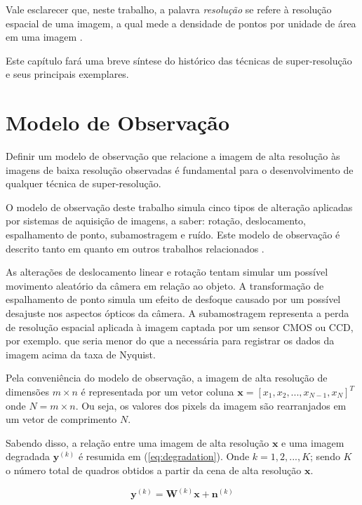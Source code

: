 \documentclass[12pt,openright,oneside,a4paper,english,brazil]{abntex2}
\begin{document}
Vale esclarecer que, neste trabalho, a palavra \textit{resolução} se refere à resolução espacial de uma imagem, a qual mede a densidade de pontos por unidade de área em uma imagem \cite{zibetti2007super}.

Este capítulo fará uma breve síntese do histórico das técnicas de super-resolução e seus principais exemplares.

\section{Modelo de Observação}
\label{sec:obsmodel}

Definir um modelo de observação que relacione a imagem de alta resolução às imagens de baixa resolução observadas é fundamental para o desenvolvimento de qualquer técnica de super-resolução.

O modelo de observação deste trabalho simula cinco tipos de alteração aplicadas por sistemas de aquisição de imagens, a saber: rotação, deslocamento, espalhamento de ponto, subamostragem e ruído.
Este modelo de observação é descrito tanto em \cite{tipping2003bayesian} quanto em outros trabalhos relacionados \cite{pickup2007bayesian, Capel01a}.

As alterações de deslocamento linear e rotação tentam simular um possível movimento aleatório da câmera em relação ao objeto.
A transformação de espalhamento de ponto simula um efeito de desfoque causado por um possível desajuste nos aspectos ópticos da câmera.
A subamostragem representa a perda de resolução espacial aplicada à imagem captada por um sensor CMOS ou CCD, por exemplo.
que seria menor do que a necessária para registrar os dados da imagem acima da taxa de Nyquist.

Pela conveniência do modelo de observação, a imagem de alta resolução de dimensões $m \times n$ é representada por um vetor coluna $\mathbf{x} = [x_1, x_2, ... , x_{N-1}, x_N]^T$ onde $N ={} m \times n$. Ou seja, os valores dos pixels da imagem são rearranjados em um vetor de comprimento $N$.

Sabendo disso, a relação entre uma imagem de alta resolução $\mathbf{x}$ e uma imagem degradada $\mathbf{y}^{(k)}$ é resumida em (\ref{eq:degradation}). Onde $k = 1,2,...,K$; sendo $K$ o número total de quadros obtidos a partir da cena de alta resolução $\mathbf{x}$.

\begin{equation}
	\label{eq:degradation}
	\mathbf{y}^{(k)} = \mathbf{W}^{(k)}\mathbf{x} + \mathbf{n}^{(k)}
\end{equation}
\end{document}
